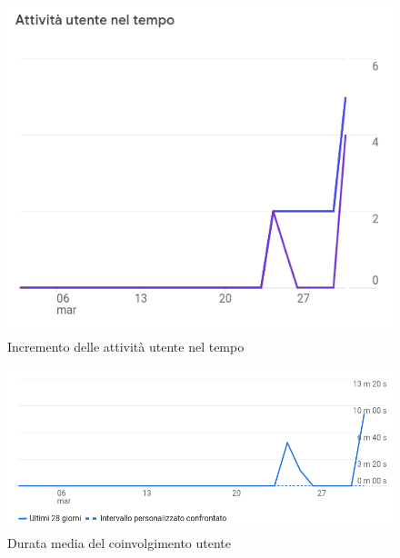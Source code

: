 \documentclass{natourDoc}
\begin{document}
\begin{figure}[!htbp]
	\centering
	\includegraphics{./analytics/attivita-utenti.png}
	\caption{Incremento delle attività utente nel tempo}
\end{figure}
\FloatBarrier

\begin{figure}[!htbp]
	\centering
	\includegraphics[width=\textwidth]{./analytics/durata-media-coinvolgimento.png}
	\caption{Durata media del coinvolgimento utente}
\end{figure}
\FloatBarrier

\newpage
\end{document}
